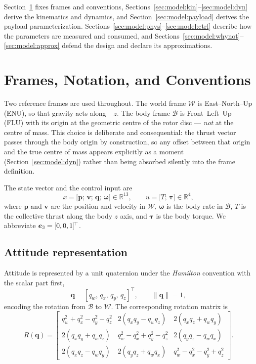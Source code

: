 Section~\ref{sec:model:frames} fixes frames and conventions,
Sections~\ref{sec:model:kin}--\ref{sec:model:dyn} derive the kinematics
and dynamics, and Section~\ref{sec:model:payload} derives the payload
parameterization. Sections~\ref{sec:model:phys}--\ref{sec:model:ctrl}
describe how the parameters are measured and consumed, and
Sections~\ref{sec:model:whynot}--\ref{sec:model:approx} defend the design
and declare its approximations.

\section{Frames, Notation, and Conventions}\label{sec:model:frames}

Two reference frames are used throughout. The world frame $\mathcal{W}$
is East--North--Up (ENU), so that gravity acts along $-z$. The body frame
$\mathcal{B}$ is Front--Left--Up (FLU) with its origin at the geometric
centre of the rotor disc --- \emph{not} at the centre of mass. This
choice is deliberate and consequential: the thrust vector passes through
the body origin by construction, so any offset between that origin and
the true centre of mass appears explicitly as a moment
(Section~\ref{sec:model:dyn}) rather than being absorbed silently into
the frame definition.

The state vector and the control input are
\begin{equation}
x = \bigl[\bm{p};\, \bm{v};\, \bm{q};\, \bm{\omega}\bigr] \in \mathbb{R}^{13},
\qquad
u = \bigl[T;\, \bm{\tau}\bigr] \in \mathbb{R}^{4},
\label{eq:state}
\end{equation}
where $\bm{p}$ and $\bm{v}$ are the position and velocity in
$\mathcal{W}$, $\bm{\omega}$ is the body rate in $\mathcal{B}$, $T$ is the
collective thrust along the body $z$ axis, and $\bm{\tau}$ is the body
torque. We abbreviate $\bm{e}_3 = [0,0,1]^{\!\top}$.

\subsection{Attitude representation}\label{sec:model:quat}

Attitude is represented by a unit quaternion under the \emph{Hamilton}
convention with the scalar part first,
\begin{equation}
\bm{q} = [q_w,\, q_x,\, q_y,\, q_z]^{\!\top},
\qquad \|\bm{q}\| = 1,
\label{eq:quatdef}
\end{equation}
encoding the rotation from $\mathcal{B}$ to $\mathcal{W}$. The
corresponding rotation matrix is
\begin{equation}
R(\bm{q}) =
\begin{bmatrix}
q_w^2 + q_x^2 - q_y^2 - q_z^2 & 2(q_xq_y - q_wq_z) & 2(q_xq_z + q_wq_y) \\[2pt]
2(q_xq_y + q_wq_z) & q_w^2 - q_x^2 + q_y^2 - q_z^2 & 2(q_yq_z - q_wq_x) \\[2pt]
2(q_xq_z - q_wq_y) & 2(q_yq_z + q_wq_x) & q_w^2 - q_x^2 - q_y^2 + q_z^2
\end{bmatrix}.
\label{eq:Rq}
\end{equation}


